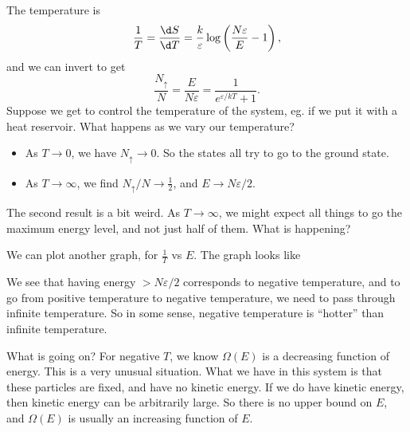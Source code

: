 \documentclass[a4paper]{article}
\begin{document}
\begin{eg}
\begin{center}
  \end{center}
  The temperature is
  \[
    \frac{1}{T} = \frac{\d S}{\d T} = \frac{k}{\varepsilon} \log \left(\frac{N \varepsilon}{E} - 1\right),
  \]
  and we can invert to get
  \[
    \frac{N_{\uparrow}}{N} = \frac{E}{N\varepsilon} = \frac{1}{e^{\varepsilon /kT} + 1}.
  \]
  Suppose we get to control the temperature of the system, eg. if we put it with a heat reservoir. What happens as we vary our temperature?
  \begin{itemize}
    \item As $T \to 0$, we have $N_\uparrow \to 0$. So the states all try to go to the ground state.
    \item As $T \to \infty$, we find $N_\uparrow/N \to \frac{1}{2}$, and $E \to N\varepsilon/2$.
  \end{itemize}
  The second result is a bit weird. As $T \to \infty$, we might expect all things to go the maximum energy level, and not just half of them. What is happening?

  We can plot another graph, for $\frac{1}{T}$ vs $E$. The graph looks like
  \begin{center}
  \end{center}
  We see that having energy $> N\varepsilon/2$ corresponds to negative temperature, and to go from positive temperature to negative temperature, we need to pass through infinite temperature. So in some sense, negative temperature is ``hotter'' than infinite temperature.

  What is going on? For negative $T$, we know $\Omega(E)$ is a decreasing function of energy. This is a very unusual situation. What we have in this system is that these particles are fixed, and have no kinetic energy. If we do have kinetic energy, then kinetic energy can be arbitrarily large. So there is no upper bound on $E$, and $\Omega(E)$ is usually an increasing function of $E$.


\end{eg}
\end{document}
